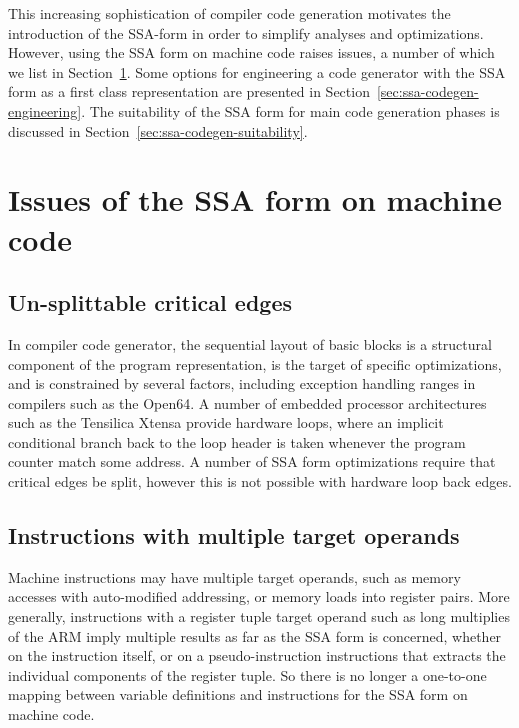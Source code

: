 This increasing sophistication of compiler code generation motivates the
introduction of the SSA-form in order to simplify analyses and optimizations.
However, using the SSA form on machine code raises issues, a number of
which we list in Section~\ref{sec:ssa-codegen-issues}.  Some options for
engineering a code generator with the SSA form as a first class representation
are presented in Section~\ref{sec:ssa-codegen-engineering}.  The suitability of
the SSA form for main code generation phases is discussed in
Section~\ref{sec:ssa-codegen-suitability}.

\section{Issues of the SSA form on machine code}
\label{sec:ssa-codegen-issues}

\subsection{Un-splittable critical edges}

In compiler code generator, the sequential layout of basic blocks is a
structural component of the program representation, is the target of specific
optimizations, and is constrained by several factors, including exception
handling ranges in compilers such as the Open64. A number of embedded processor
architectures such as the Tensilica Xtensa provide hardware loops, where an
implicit conditional branch back to the loop header is taken whenever the
program counter match some address. A number of SSA form optimizations require
that critical edges be split, however this is not possible with hardware loop
back edges.

\subsection{Instructions with multiple target operands}

Machine instructions may have multiple target operands, such as memory
accesses with auto-modified addressing, or memory loads into register pairs.
More generally, instructions with a register tuple target operand such as long
multiplies of the ARM imply multiple results as far as the SSA form is
concerned, whether on the instruction itself, or on a pseudo-instruction
instructions that extracts the individual components of the register tuple. So
there is no longer a one-to-one mapping between variable definitions and
instructions for the SSA form on machine code.

